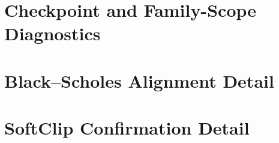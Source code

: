 \documentclass[conference]{IEEEtran}
\begin{document}
\section{Checkpoint and Family-Scope Diagnostics}

\begin{table}[h]
\centering
\footnotesize
\resizebox{0.93\textwidth}{!}{}
\caption{Deep Hedging checkpoint and saturation audit from the completed run.
Epoch $-1$ denotes the initialized checkpoint. ``Paths touching bound'' is a
path-level diagnostic and can be high even when average occupancy is lower.}
\label{tab:dh-audit}
\end{table}

\begin{table}[h]
\centering
\footnotesize
\resizebox{\columnwidth}{!}{}
\caption{Scope of the selected historical PH family. Each ticker contributes a
mean and tail selection per liability.}
\label{tab:family-scope}
\end{table}

\section{Black--Scholes Alignment Detail}

\begin{table}[h]
\centering
\footnotesize
\resizebox{\columnwidth}{!}{}
\caption{Notebook-faithful Black--Scholes utility levels versus the values
stored in the released author notebook.}
\label{tab:bs-alignment}
\end{table}

\section{SoftClip Confirmation Detail}

\begin{table}[h]
\centering
\footnotesize
\resizebox{0.96\textwidth}{!}{}
\caption{European SPY, seed 2345, model-level metrics. These are a one-seed
implementation sensitivity and not panel inference.}
\label{tab:softclip-levels}
\end{table}

\begin{table}[h]
\centering
\footnotesize
\resizebox{0.92\textwidth}{!}{}
\caption{Paired temporal-block contrasts for the SoftClip sensitivity. All 95\%
intervals contain zero.}
\label{tab:softclip-contrasts}
\end{table}
\end{document}
